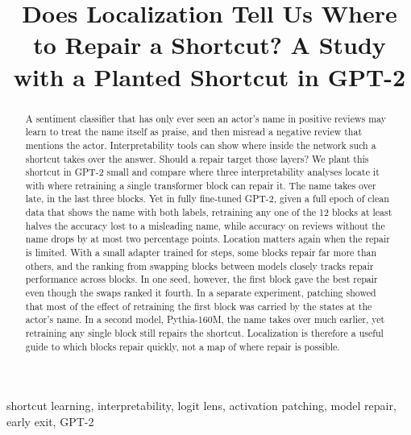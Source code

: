 \documentclass[conference]{IEEEtran}
\begin{document}
\title{Does Localization Tell Us Where to Repair a Shortcut? A Study with a Planted Shortcut in GPT-2}

\author{
}

\maketitle

\begin{abstract}
A sentiment classifier that has only ever seen an actor's name in positive reviews may learn to treat the name itself
as praise, and then misread a negative review that mentions the actor. Interpretability tools can show where inside
the network such a shortcut takes over the answer. Should a repair target those layers? We plant this shortcut in
GPT-2 small and compare where three interpretability analyses locate it with where retraining a single transformer
block can repair it. The name takes over late, in the last three blocks. Yet in fully fine-tuned GPT-2, given a full epoch of clean data that
shows the name with both labels, retraining any one of the 12 blocks at least halves the accuracy lost to a
misleading name, while accuracy on reviews without the name drops by at most two percentage points. Location matters
again when the repair is limited. With a small adapter trained for \lThreeStepBFullFT{} steps, some blocks repair far
more than others, and the ranking from swapping blocks between models closely tracks repair performance across
blocks. In one seed, however, the first block gave the best repair even though the swaps ranked it fourth. In a separate
experiment, patching showed that most of the effect of retraining the first block was carried by the states at the
actor's name. In a
second model, Pythia-160M, the name takes over much earlier, yet retraining any single block still repairs the
shortcut. Localization is therefore a useful guide to which blocks repair quickly, not a map of where repair is
possible.
\end{abstract}

\begin{IEEEkeywords}
shortcut learning, interpretability, logit lens, activation patching, model repair, early exit, GPT-2
\end{IEEEkeywords}















\appendices

\end{document}
